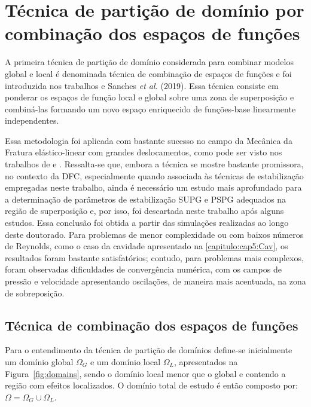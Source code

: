 \chapter[Técnica de partição de domínio por combinação dos espaços de funções]{Técnica de partição de domínio por combinação dos espaços de funções} \label{capitulo:Cap5}

A primeira técnica de partição de domínio considerada para combinar modelos global e local é denominada técnica de combinação de espaços de funções e foi introduzida nos trabalhos  e Sanches \textit{et al.} (2019). Essa técnica consiste em ponderar os espaços de função local e global sobre uma zona de superposição e combiná-las formando um novo espaço enriquecido de funções-base linearmente independentes. 

Essa metodologia foi aplicada com bastante sucesso no campo da Mecânica da Fratura elástico-linear com grandes deslocamentos, como pode ser visto nos trabalhos de  e . Ressalta-se que, embora a técnica se mostre bastante promissora, no contexto da DFC, especialmente quando associada às técnicas de estabilização empregadas neste trabalho, ainda é necessário um estudo mais aprofundado para a determinação de parâmetros de estabilização SUPG e PSPG adequados na região de superposição e, por isso, foi descartada neste trabalho após alguns estudos. Essa conclusão foi obtida a partir das simulações realizadas ao longo deste doutorado. Para problemas de menor complexidade ou com baixos números de Reynolds, como o caso da cavidade apresentado na \autoref{capitulo:cap5:Cav}, os resultados foram bastante satisfatórios; contudo, para problemas mais complexos, foram observadas dificuldades de convergência numérica, com os campos de pressão e velocidade apresentando oscilações, de maneira mais acentuada, na zona de sobreposição.

\section{Técnica de combinação dos espaços de funções}

Para o entendimento da técnica de partição de domínios define-se inicialmente um domínio global $\Omega_G$ e um domínio local $\Omega_L$, apresentados na Figura~\ref{fig:domains}, sendo o domínio local menor que o global e contendo a região com efeitos localizados. O domínio total de estudo é então composto por: $\Omega = \Omega_G \cup \Omega_L$.

